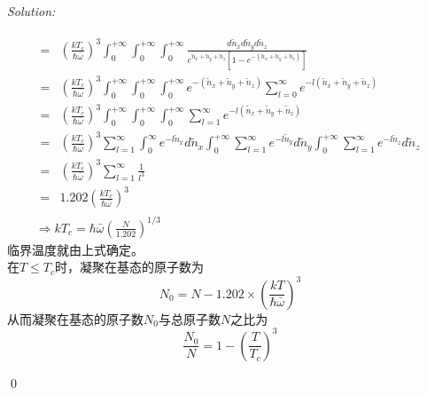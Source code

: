 \documentclass[12pt,a4paper]{article}
\newenvironment{sol}
    {\emph{Solution:}
    }
    {
    \qed
    }
\begin{document}
\begin{sol}
\begin{gather}
\begin{align}
\nonumber=&\left(\frac{kT_c}{\hbar\bar{\omega}}\right)^3\int_0^{+\infty}\int_0^{+\infty}\int_0^{+\infty}\frac{d\tilde{n}_xd\tilde{n}_yd\tilde{n}_z}{e^{\tilde{n}_x+\tilde{n}_y+\tilde{n}_z}[1-e^{-(\tilde{n}_x+\tilde{n}_y+\tilde{n}_z)}]}\\
\nonumber=&\left(\frac{kT_c}{\hbar\bar{\omega}}\right)^3\int_0^{+\infty}\int_0^{+\infty}\int_0^{+\infty}e^{-(\tilde{n}_x+\tilde{n}_y+\tilde{n}_z)}\sum_{l=0}^{\infty}e^{-l(\tilde{n}_x+\tilde{n}_y+\tilde{n}_z)}\\
\nonumber=&\left(\frac{kT_c}{\hbar\bar{\omega}}\right)^3\int_0^{+\infty}\int_0^{+\infty}\int_0^{+\infty}\sum_{l=1}^{\infty}e^{-l(\tilde{n}_x+\tilde{n}_y+\tilde{n}_z)}\\
\nonumber=&\left(\frac{kT_c}{\hbar\bar{\omega}}\right)^3\sum_{l=1}^{\infty}\int_0^{\infty}e^{-l\tilde{n}_x}d\tilde{n}_x\int_0^{+\infty}\sum_{l=1}^{\infty}e^{-l\tilde{n}_y}d\tilde{n}_y\int_0^{+\infty}\sum_{l=1}^{\infty}e^{-l\tilde{n}_z}d\tilde{n}_z\\
\nonumber=&\left(\frac{kT_c}{\hbar\bar{\omega}}\right)^3\sum_{l=1}^{\infty}\frac{1}{l^3}\\
=&1.202\left(\frac{kT_c}{\hbar\bar{\omega}}\right)^3
\end{align}\\
\Longrightarrow kT_c=\hbar\bar{\omega}\left(\frac{N}{1.202}\right)^{1/3}
\end{gather}
临界温度就由上式确定。\\
在$T\leq T_c$时，凝聚在基态的原子数为
\begin{equation}
N_0=N-1.202\times\left(\frac{kT}{\hbar\bar{\omega}}\right)^3
\end{equation}
从而凝聚在基态的原子数$N_0$与总原子数$N$之比为
\begin{equation}
\frac{N_0}{N}=1-\left(\frac{T}{T_c}\right)^3
\end{equation}
\end{sol}
\end{document}
